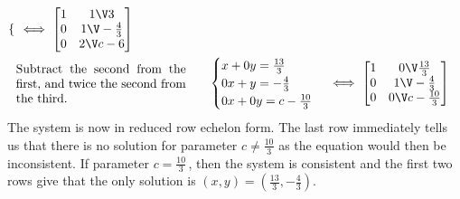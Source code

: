 \begin{example}
\begin{solution}
\begin{align*}
\begin{cases}
\end{cases}
&\iff
\begin{bmatrix} 1&1\V3\\0&1\V-\frac43\\0&2\V c-6 \end{bmatrix}
\\&
\parbox{0.4\linewidth}{Subtract the second from the first, and twice the second from the third.}
\quad&
\begin{cases}
x+0y=\frac{13}3\\0x+y=-\frac43\\0x+0y=c-\frac{10}3
\end{cases}
&\iff
\begin{bmatrix} 1&0\V\frac{13}3\\0&1\V-\frac43\\0&0\V c-\frac{10}3 \end{bmatrix}
\end{align*}
The system is now in reduced row echelon form.
The last row immediately tells us that there is no solution for parameter \(c\neq\frac{10}3\) as the equation would then be inconsistent.
If parameter \(c=\frac{10}3\)\,, then the system is consistent and the first two rows give that the only solution is \((x,y)=(\frac{13}3,-\frac43)\).
\end{solution}
\end{example}



